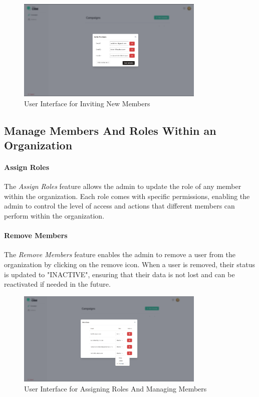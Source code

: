\begin{figure}[ht]
\centering
\includegraphics[width=0.8\textwidth]{Images/sprint2/screenshots/Screenshot 2024-06-06 004557.png}
\caption{User Interface for Inviting New Members}
\end{figure}

\subsection{Manage Members And Roles Within an Organization}
\paragraph*{Assign Roles}
The \textit{Assign Roles} feature allows the admin to update the role of any member within the organization. Each role comes with specific permissions, enabling the admin to control the level of access and actions that different members can perform within the organization.

\paragraph*{Remove Members}
The \textit{Remove Members} feature enables the admin to remove a user from the organization by clicking on the remove icon. When a user is removed, their status is updated to "INACTIVE", ensuring that their data is not lost and can be reactivated if needed in the future.

\begin{figure}[ht]
\centering
\includegraphics[width=0.8\textwidth]{Images/sprint2/screenshots/Screenshot 2024-06-06 004631.png}
\caption{User Interface for Assigning Roles And Managing Members}
\label{fig:User Interface for Assigning Roles And Managing Members}
\end{figure}


